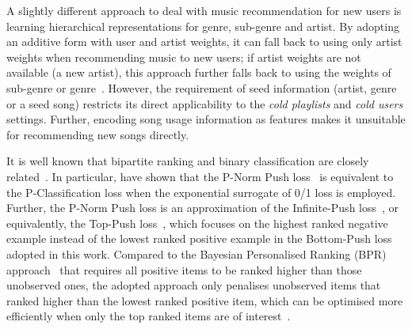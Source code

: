 A slightly different approach to deal with music recommendation for new users is learning hierarchical 
representations for genre, sub-genre and artist.
By adopting an additive form with user and artist weights, it can fall back to using only artist weights
when recommending music to new users; if artist weights are not available (\eg a new artist), this approach 
further falls back to using the weights of sub-genre or genre~\cite{ben2017groove}.
However, the requirement of seed information (\eg artist, genre or a seed song) restricts its direct applicability to
the \emph{cold playlists} and \emph{cold users} settings. %
Further, encoding song usage information as features makes it unsuitable 
for recommending new songs directly.
%
%



It is well known
that bipartite ranking and binary classification are
closely related~\cite{ertekin2011equivalence,menon2016bipartite}.
In particular, \citet{ertekin2011equivalence} have shown that the P-Norm Push %
loss~\cite{rudin2009p}
is equivalent to the P-Classification loss when %
the exponential surrogate of 0/1 loss is employed.
Further, the P-Norm Push loss is an approximation of the Infinite-Push loss~\cite{agarwal2011infinite},
or equivalently, the Top-Push loss~\cite{li2014top}, which focuses on the highest ranked negative example instead of
the lowest ranked positive example in the Bottom-Push loss adopted in this work.
%
Compared to the Bayesian Personalised Ranking (BPR) approach~\cite{rendle2009bpr,mcfee2012million} that requires all
positive items to be ranked higher than those unobserved ones, 
the adopted approach only penalises unobserved items that ranked higher than the lowest ranked positive item,
which can be optimised more efficiently 
when only the top ranked items are of interest~\cite{rudin2009p,li2014top}.


